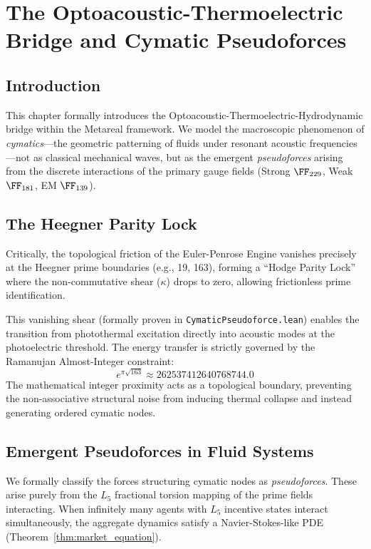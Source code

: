 \chapter[Optoacoustic Cymatics]{The Optoacoustic-Thermoelectric Bridge and Cymatic Pseudoforces}\label{ch:optoacoustic}

\section{Introduction}
This chapter formally introduces the Optoacoustic-Thermoelectric-Hydrodynamic bridge within the Metareal framework. We model the macroscopic phenomenon of \emph{cymatics}---the geometric patterning of fluids under resonant acoustic frequencies---not as classical mechanical waves, but as the emergent \emph{pseudoforces} arising from the discrete interactions of the primary gauge fields (Strong $\FF_{229}$, Weak $\FF_{181}$, EM $\FF_{139}$).

\section{The Heegner Parity Lock}
Critically, the topological friction of the Euler-Penrose Engine vanishes precisely at the Heegner prime boundaries (e.g., 19, 163), forming a ``Hodge Parity Lock'' where the non-commutative shear ($\kappa$) drops to zero, allowing frictionless prime identification.

This vanishing shear (formally proven in \texttt{CymaticPseudoforce.lean}) enables the transition from photothermal excitation directly into acoustic modes at the photoelectric threshold. The energy transfer is strictly governed by the Ramanujan Almost-Integer constraint:
\begin{equation}
    e^{\pi\sqrt{163}} \approx 262537412640768744.0
\end{equation}
The mathematical integer proximity acts as a topological boundary, preventing the non-associative structural noise from inducing thermal collapse and instead generating ordered cymatic nodes.

\section{Emergent Pseudoforces in Fluid Systems}
We formally classify the forces structuring cymatic nodes as \emph{pseudoforces}. These arise purely from the $L_5$ fractional torsion mapping of the prime fields interacting. When infinitely many agents with $L_5$ incentive states interact simultaneously, the aggregate dynamics satisfy a Navier-Stokes-like PDE (Theorem~\ref{thm:market_equation}).

